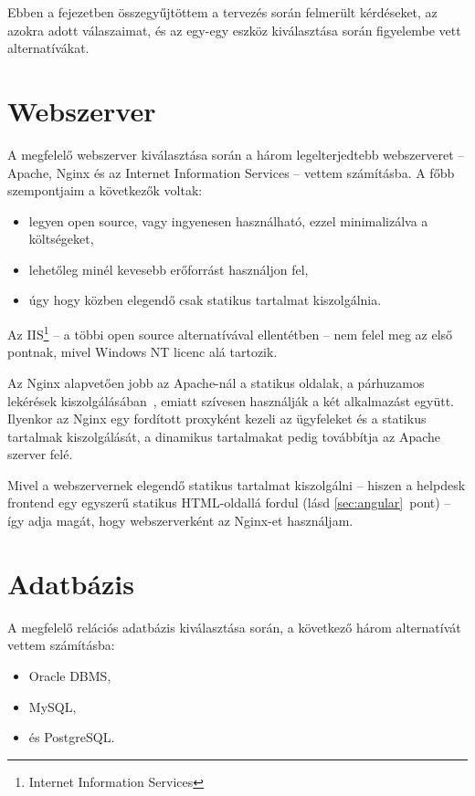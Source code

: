 Ebben a fejezetben összegyűjtöttem a tervezés során felmerült kérdéseket, az azokra adott válaszaimat, és az egy-egy eszköz kiválasztása során figyelembe vett alternatívákat.



\section{Webszerver}
A megfelelő webszerver kiválasztása során a három legelterjedtebb\cite{W3Techs_Usage_statistics_of_webservers} webszerveret --  Apache, Nginx és az Internet Information Services -- vettem számításba. A főbb szempontjaim a következők voltak:
\begin{itemize}
	\item legyen open source, vagy ingyenesen használható, ezzel minimalizálva a költségeket,
	\item lehetőleg minél kevesebb erőforrást használjon fel,
	\item úgy hogy közben elegendő csak statikus tartalmat kiszolgálnia.
\end{itemize}

Az IIS\footnote{Internet Information Services} --  a többi open source alternatívával ellentétben --   nem felel meg az első pontnak, mivel Windows NT licenc alá tartozik.

Az Nginx alapvetően jobb az Apache-nál a statikus oldalak, a párhuzamos lekérések kiszolgálásában~\cite{nginx_performance}, emiatt szívesen használják a két alkalmazást együtt. Ilyenkor az Nginx egy fordított proxyként kezeli az ügyfeleket és a statikus tartalmak kiszolgálását, a dinamikus tartalmakat pedig továbbítja az Apache szerver felé.

Mivel a webszervernek elegendő statikus tartalmat kiszolgálni --  hiszen a helpdesk frontend egy egyszerű statikus HTML-oldallá fordul (lásd \ref{sec:angular}~pont) --   így adja magát, hogy webszerverként az Nginx-et használjam.




\section{Adatbázis}
A megfelelő relációs adatbázis kiválasztása során, a következő három alternatívát vettem számításba:
\begin{itemize}
	\item Oracle DBMS,
	\item MySQL,
	\item és PostgreSQL.
\end{itemize}

